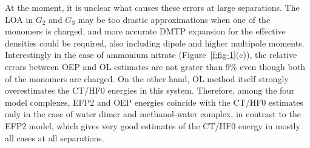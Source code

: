 At the moment, it is unclear what causes these errors at large separations. 
The LOA in $G_2$ and $G_3$ may be too drastic approximations
when one of the monomers is charged, and more accurate
DMTP expansion for the effective densities could be required,
also including dipole and higher multipole moments. %
Interestingly in the case of ammonium nitrate (Figure~\ref{f:fig-1}(c)),
the relative errors between OEP and OL estimates
are not grater than 9\% even though both of the monomers are charged.
On the other hand, OL method itself strongly overestimates the CT/HF0
energies in this system. Therefore, among the four
model complexes, EFP2 and OEP energies
coincide with the CT/HF0 estimates 
only in the case of water dimer and methanol-water complex,
in contrast to the EFP2 model, which gives very good estimates
of the CT/HF0 energy in mostly all cases at all separations.


